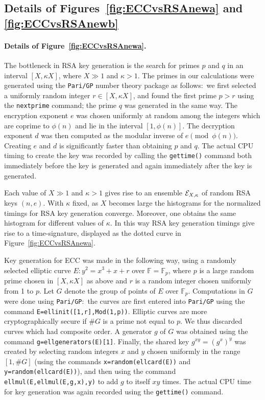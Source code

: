 \documentclass{llncs}
\numberwithin{equation}{section}
\newcommand\F{{\mathbb F}}
\renewcommand\({\left(}
\renewcommand\){\right)}
\begin{document}
\subsection{Details of Figures~\ref{fig:ECCvsRSAnewa} and \ref{fig:ECCvsRSAnewb}}\label{sec:sub:figures}


\paragraph{\bf Details of Figure~\ref{fig:ECCvsRSAnewa}.}
The bottleneck in RSA key generation is the search for   primes  $p$ and $q$ in an interval $[X,\kappa X]$, where  $X\gg 1$ and $\kappa>1$.   The primes in our calculations were generated using the {\tt Pari/GP} number theory package \cite{parigp} as follows:~we first selected a uniformly random integer $r\in [X,\kappa X]$, and found the first prime $p>r$ using the {\tt nextprime}
command; the prime $q$ was generated in the same way.  The encryption exponent $e$ was chosen uniformly at random among the integers  which are coprime to $\phi(n)$ and lie in the interval $[1,\phi(n)]$.  The decryption exponent $d$ was then computed as the modular inverse of $e\pmod{\phi(n)}$.  Creating $e$ and $d$ is significantly faster than obtaining   $p$ and $q$. The actual CPU   timing to create the key was recorded by calling  the {\tt gettime()} command both immediately before the key is generated and again immediately after the key is  generated.

Each value of $X\gg 1$ and $\kappa>1$ gives rise to an ensemble ${\cal E}_{X,\kappa}$ of random RSA keys $(n,e)$.  With $\kappa$ fixed, as $X$ becomes large the histograms for the normalized timings for RSA key generation converge.  Moreover, one obtains the same histogram for different values of $\kappa$.  In this way RSA key generation timings give rise to a time-signature, displayed as the dotted curve in Figure~\ref{fig:ECCvsRSAnewa}.


Key generation for ECC  was made in the following way, using a randomly selected elliptic curve $E:y^2=x^3+x+r$ over $\F=\F_p$, where $p$ is a large random prime chosen in $[X,\kappa X]$ as above and $r$
is a random integer chosen uniformly from 1 to $p$.  Let $G$ denote the group of points of $E$ over $\F_p$.  Computations in $G$ were done using {\tt Pari/GP}:~the curves are first entered into  {\tt Pari/GP}  using the command {\tt E=ellinit([1,r],Mod(1,p))}.  Elliptic curves are more cryptographically secure if  $\# G$ is a prime not equal to $p$.  We thus discarded curves which had composite order.  A generator $g$ of $G$ was obtained using  the command {\tt g=ellgenerators(E)[1]}. Finally, the shared key $g^{xy}=(g^x)^y$ was created by selecting random integers $x$ and $y$ chosen uniformly in the range $[1,\#G]$ (using the commands {\tt x=random(ellcard(E))} and {\tt y=random(ellcard(E))}), and then using the command {\tt ellmul(E,ellmul(E,g,x),y)} to add $g$ to itself $xy$ times.
  The actual CPU time for key generation was again recorded using the {\tt gettime()} command.
\end{document}
